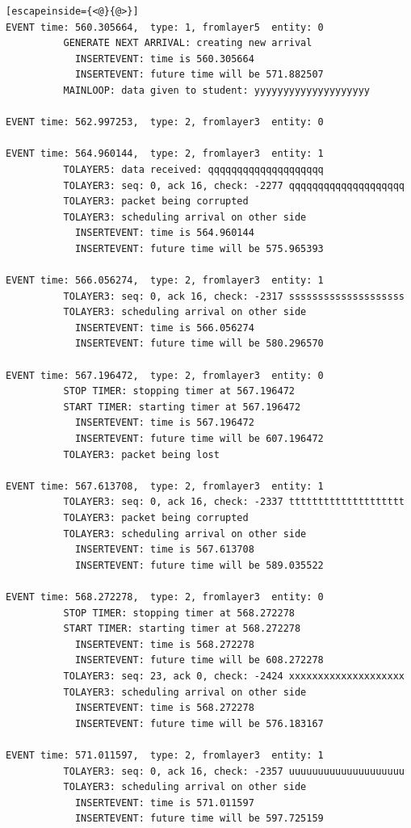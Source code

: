 \documentclass[paper=a4, fontsize=11pt]{scrartcl}
\numberwithin{equation}{section}		%
\numberwithin{figure}{section}			%
\numberwithin{table}{section}				%
\begin{document}
\begin{lstlisting}[escapeinside={<@}{@>}]
EVENT time: 560.305664,  type: 1, fromlayer5  entity: 0
          GENERATE NEXT ARRIVAL: creating new arrival
            INSERTEVENT: time is 560.305664
            INSERTEVENT: future time will be 571.882507
          MAINLOOP: data given to student: yyyyyyyyyyyyyyyyyyyy

EVENT time: 562.997253,  type: 2, fromlayer3  entity: 0

EVENT time: 564.960144,  type: 2, fromlayer3  entity: 1
          TOLAYER5: data received: qqqqqqqqqqqqqqqqqqqq
          TOLAYER3: seq: 0, ack 16, check: -2277 qqqqqqqqqqqqqqqqqqqq
          TOLAYER3: packet being corrupted
          TOLAYER3: scheduling arrival on other side
            INSERTEVENT: time is 564.960144
            INSERTEVENT: future time will be 575.965393

EVENT time: 566.056274,  type: 2, fromlayer3  entity: 1
          TOLAYER3: seq: 0, ack 16, check: -2317 ssssssssssssssssssss
          TOLAYER3: scheduling arrival on other side
            INSERTEVENT: time is 566.056274
            INSERTEVENT: future time will be 580.296570

EVENT time: 567.196472,  type: 2, fromlayer3  entity: 0
          STOP TIMER: stopping timer at 567.196472
          START TIMER: starting timer at 567.196472
            INSERTEVENT: time is 567.196472
            INSERTEVENT: future time will be 607.196472
          TOLAYER3: packet being lost

EVENT time: 567.613708,  type: 2, fromlayer3  entity: 1
          TOLAYER3: seq: 0, ack 16, check: -2337 tttttttttttttttttttt
          TOLAYER3: packet being corrupted
          TOLAYER3: scheduling arrival on other side
            INSERTEVENT: time is 567.613708
            INSERTEVENT: future time will be 589.035522

EVENT time: 568.272278,  type: 2, fromlayer3  entity: 0
          STOP TIMER: stopping timer at 568.272278
          START TIMER: starting timer at 568.272278
            INSERTEVENT: time is 568.272278
            INSERTEVENT: future time will be 608.272278
          TOLAYER3: seq: 23, ack 0, check: -2424 xxxxxxxxxxxxxxxxxxxx
          TOLAYER3: scheduling arrival on other side
            INSERTEVENT: time is 568.272278
            INSERTEVENT: future time will be 576.183167

EVENT time: 571.011597,  type: 2, fromlayer3  entity: 1
          TOLAYER3: seq: 0, ack 16, check: -2357 uuuuuuuuuuuuuuuuuuuu
          TOLAYER3: scheduling arrival on other side
            INSERTEVENT: time is 571.011597
            INSERTEVENT: future time will be 597.725159


\end{lstlisting}
\end{document}

